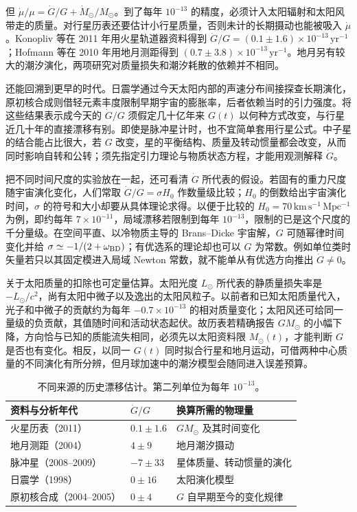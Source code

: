 但 $\dot\mu/\mu=\dot G/G+\dot M_\odot/M_\odot$。到了每年 $10^{-13}$ 的精度，必须计入太阳辐射和太阳风带走的质量。对行星历表还要估计小行星质量，否则未计的长期摄动也能被吸入 $\dot\mu$。Konopliv 等在 2011 年用火星轨道器资料得到 $\dot G/G=(0.1\pm1.6)\times10^{-13}\,\mathrm{yr}^{-1}$；Hofmann 等在 2010 年用地月测距得到 $(0.7\pm3.8)\times10^{-13}\,\mathrm{yr}^{-1}$。地月另有较大的潮汐演化，两项研究对质量损失和潮汐耗散的依赖并不相同。

还能回溯到更早的时代。日震学通过今天太阳内部的声速分布间接探查长期演化，原初核合成则借轻元素丰度限制早期宇宙的膨胀率，后者依赖当时的引力强度。将这些结果表示成今天的 $\dot G/G$ 须假定几十亿年来 $G(t)$ 以何种方式改变，与行星近几十年的直接漂移有别。即使是脉冲星计时，也不宜简单套用行星公式。中子星的结合能占比很大，若 $G$ 改变，星的平衡结构、质量及转动惯量都会改变，从而同时影响自转和公转；须先指定引力理论与物质状态方程，才能用观测解释 $\dot G$。

把不同时间尺度的实验放在一起，还可看清 $\dot G$ 所代表的假设。若固有的重力尺度随宇宙演化变化，人们常取 $\dot G/G=\sigma H_0$ 作数量级比较；$H_0$ 的倒数给出宇宙演化时间，$\sigma$ 的符号和大小却要从具体理论求得。以便于比较的 $H_0=70\,\mathrm{km\,s^{-1}\,Mpc^{-1}}$ 为例，即约每年 $7\times10^{-11}$，局域漂移若限制到每年 $10^{-13}$，限制的已是这个尺度的千分量级。在空间平直、以冷物质主导的 Brans--Dicke 宇宙解，$G$ 可随幂律时间变化并给 $\sigma\simeq-1/(2+\omega_{\rm BD})$；有优选系的理论却也可以 $G$ 为常数。例如单位类时矢量若只以其固定模进入局域 Newton 常数，就不能单从有优选方向推出 $\dot G\ne0$。

关于太阳质量的扣除也可定量估算。太阳光度 $L_\odot$ 所代表的静质量损失率是 $-L_\odot/c^2$，尚有太阳中微子以及逸出的太阳风粒子。以前者和已知太阳质量代入，光子和中微子的贡献约为每年 $-0.7\times10^{-13}$ 的相对质量变化；太阳风还可给同一量级的负贡献，其值随时间和活动状态起伏。故历表若精确报告 $GM_\odot$ 的小幅下降，方向恰与已知的质能流失相同，必须先以太阳资料限 $M_\odot(t)$，才能判断 $G$ 是否也有变化。相反，以同一 $G(t)$ 同时拟合行星和地月运动，可借两种中心质量的不同演化有所分辨，但月球加速中的潮汐模型会随同进入误差预算。

\begin{table}[htbp]\centering\small
\caption{不同来源的历史漂移估计。第二列单位为每年 $10^{-13}$。}
\begin{tabular}{@{}lll@{}}\hline
资料与分析年代 & $\dot G/G$ & 换算所需的物理量\\ \hline
火星历表（2011） & $0.1\pm1.6$ & $GM_\odot$ 及其时间变化\\
地月测距（2004） & $4\pm9$ & 地月潮汐摄动\\
脉冲星（2008--2009） & $-7\pm33$ & 星体质量、转动惯量的演化\\
日震学（1998） & $0\pm16$ & 太阳演化模型\\
原初核合成（2004--2005） & $0\pm4$ & $G$ 自早期至今的变化规律\\ \hline
\end{tabular}
\end{table}


